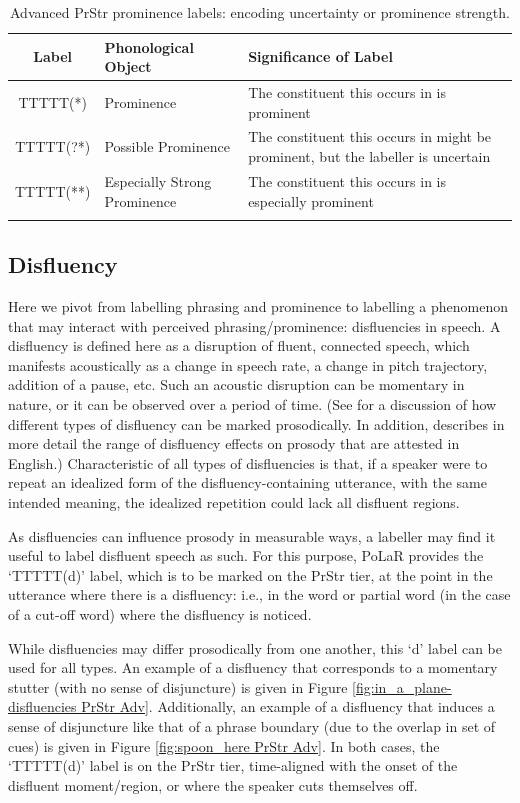 \documentclass[11pt, twoside]{memoir}
\begin{document}
\begin{longtable}{clp{.5\linewidth}} \toprule \textbf{Label} & \textbf{Phonological Object} & \textbf{Significance of Label}\tabularnewline
\midrule \endhead
\rowcolor{green}
TTTTT(*) & Prominence & The constituent this occurs in is prominent\tabularnewline
TTTTT(?*) & Possible Prominence & The constituent this occurs in might be prominent, but the labeller is uncertain \tabularnewline
TTTTT(**) & Especially Strong Prominence & The constituent this occurs in is especially prominent \tabularnewline
\bottomrule
\caption{Advanced PrStr prominence labels: encoding uncertainty or prominence strength.}
\end{longtable}

\subsection{Disfluency}\label{sec:disfluency}

Here we pivot from labelling phrasing and prominence to labelling a phenomenon that may interact with perceived phrasing\slash prominence: disfluencies in speech. A disfluency is defined here as a disruption of fluent, connected speech, which manifests acoustically as a change in speech rate, a change in pitch trajectory, addition of a pause, etc. Such an acoustic disruption can be momentary in nature, or it can be observed over a period of time. (See \citealt{shattuck-hufnagelcutler99} for a discussion of how different types of disfluency can be marked prosodically. In addition, \citealt{brugos-19} describes in more detail the range of disfluency effects on prosody that are attested in English.) Characteristic of all types of disfluencies is that, if a speaker were to repeat an idealized form of the disfluency-containing utterance, with the same intended meaning, the idealized repetition could lack all disfluent regions.

As disfluencies can influence prosody in measurable ways, a labeller may find it useful to label disfluent speech as such. For this purpose, PoLaR provides the ‘TTTTT(d)’ label, which is to be marked on the PrStr tier, at the point in the utterance where there is a disfluency: i.e., in the word or partial word (in the case of a cut-off word) where the disfluency is noticed.

While disfluencies may differ prosodically from one another, this ‘d’ label can be used for all types. An example of a disfluency that corresponds to a momentary stutter (with no sense of disjuncture) is given in Figure \ref{fig:in_a_plane-disfluencies PrStr Adv}. Additionally, an example of a disfluency that induces a sense of disjuncture like that of a phrase boundary (due to the overlap in set of cues) is given in Figure \ref{fig:spoon_here PrStr Adv}. In both cases, the ‘TTTTT(d)’ label is on the PrStr tier, time-aligned with the onset of the disfluent moment\slash region, or where the speaker cuts themselves off.
\end{document}
